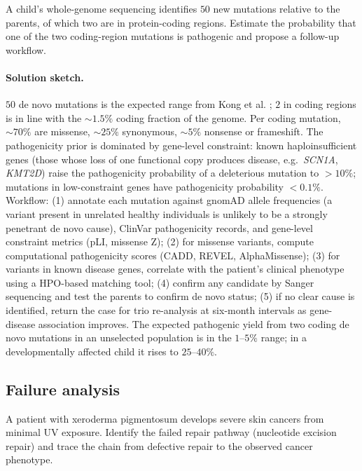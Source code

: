 \begin{exercise}
A child's whole-genome sequencing identifies $50$ new mutations
relative to the parents, of which two are in protein-coding regions.
Estimate the probability that one of the two coding-region mutations
is pathogenic and propose a follow-up workflow.
\end{exercise}

\paragraph{Solution sketch.} $50$ de novo mutations is the expected
range from Kong et al. \cite{paper:v6c03-kong-2012}; $2$ in coding
regions is in line with the $\sim 1.5\%$ coding fraction of the
genome. Per coding mutation, $\sim 70\%$ are missense, $\sim 25\%$
synonymous, $\sim 5\%$ nonsense or frameshift. The pathogenicity
prior is dominated by gene-level constraint: known haploinsufficient
genes (those whose loss of one functional copy produces disease,
e.g.\ \emph{SCN1A}, \emph{KMT2D}) raise the pathogenicity probability
of a deleterious mutation to $> 10\%$; mutations in low-constraint
genes have pathogenicity probability $< 0.1\%$. Workflow: (1) annotate
each mutation against gnomAD allele frequencies (a variant present
in unrelated healthy individuals is unlikely to be a strongly
penetrant de novo cause), ClinVar pathogenicity records, and
gene-level constraint metrics (pLI, missense Z); (2) for missense
variants, compute computational pathogenicity scores (CADD,
REVEL, AlphaMissense); (3) for variants in known disease genes,
correlate with the patient's clinical phenotype using a HPO-based
matching tool; (4) confirm any candidate by Sanger sequencing and
test the parents to confirm de novo status; (5) if no clear cause is
identified, return the case for trio re-analysis at six-month
intervals as gene-disease association improves. The expected
pathogenic yield from two coding de novo mutations in an unselected
population is in the $1$--$5\%$ range; in a developmentally affected
child it rises to $25$--$40\%$.

\subsection*{Failure analysis}

\begin{exercise}
A patient with xeroderma pigmentosum develops severe skin cancers
from minimal UV exposure. Identify the failed repair pathway
(nucleotide excision repair) and trace the chain from defective
repair to the observed cancer phenotype.
\end{exercise}

